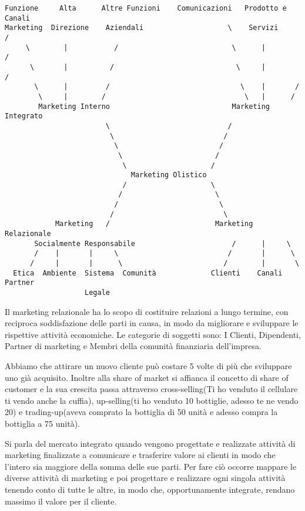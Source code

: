 \documentclass[11pt]{article}
\begin{document}
\begin{verbatim}
Funzione     Alta      Altre Funzioni    Comunicazioni   Prodotto e    Canali
Marketing  Direzione    Aziendali                    \    Servizi       /
     \        |           /                           \      |         /
      \       |          /                             \     |        /
       \      |         /                               \    |       /
        \     |        /                                 \   |      /
        Marketing Interno                             Marketing Integrato
                        \                            /
                         \                          /                           
                          \                        /
                           \                      /
                            \                    /
                              Marketing Olistico 
                            /                    \
                           /                      \
                          /                        \
                         /                          \
            Marketing   /                         Marketing Relazionale
       Socialmente Responsabile                       /      |     \
       /    |       |     \                          /       |      \
      /     |       |      \                        /        |       \
  Etica  Ambiente  Sistema  Comunità             Clienti    Canali     Partner
                   Legale                                                            
\end{verbatim}

Il marketing relazionale ha lo scopo di costituire relazioni a lungo termine, con reciproca soddisfazione delle parti in causa, in modo da migliorare e sviluppare le rispettive attività economiche. 
Le categorie di soggetti sono: I Clienti, Dipendenti, Partner di marketing e Membri della comunità finanziaria dell'impresa. 

Abbiamo che attirare un nuovo cliente può costare 5 volte di più che sviluppare uno già acquisito. Inoltre alla share of market si affianca il concetto di share of customer e la sua crescita passa attraverso cross-selling(Ti ho venduto il cellulare ti vendo anche la cuffia), up-selling(ti ho venduto 10 bottiglie, adesso te ne vendo 20) e trading-up(aveva comprato la bottiglia di 50 unità e adesso compra la bottiglia a 75 unità). 

Si parla del mercato integrato quando vengono progettate e realizzate attività di marketing finalizzate a comunicare e trasferire valore ai clienti in modo che l'intero sia maggiore della somma delle sue parti. 
Per fare ciò occorre mappare le diverse attività di marketing e poi progettare e realizzare ogni singola attività tenendo conto di tutte le altre, in modo che, opportunamente integrate, rendano massimo il valore per il cliente.
\end{document}

